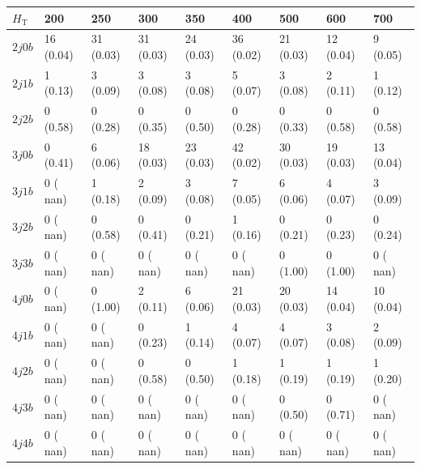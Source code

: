 \begin{table}[h]
\small
\begin{tabular}{lllllllll}
\hline \hline
$H_\textrm{T}$                 &     200 &            250 &             300&             350&             400&             500&             600&             700  \\\hline\hline
$2j 0b$&          16 (0.04)&	   31 (0.03)&	   31 (0.03)&	   24 (0.03)&	   36 (0.02)&	   21 (0.03)&	   12 (0.04)&	    9 (0.05) \\\hline
$2j 1b$&           1 (0.13)&	    3 (0.09)&	    3 (0.08)&	    3 (0.08)&	    5 (0.07)&	    3 (0.08)&	    2 (0.11)&	    1 (0.12) \\\hline
$2j 2b$&           0 (0.58)&	    0 (0.28)&	    0 (0.35)&	    0 (0.50)&	    0 (0.28)&	    0 (0.33)&	    0 (0.58)&	    0 (0.58) \\\hline
$3j 0b$&           0 (0.41)&	    6 (0.06)&	   18 (0.03)&	   23 (0.03)&	   42 (0.02)&	   30 (0.03)&	   19 (0.03)&	   13 (0.04) \\\hline
$3j 1b$&           0 ( nan)&	    1 (0.18)&	    2 (0.09)&	    3 (0.08)&	    7 (0.05)&	    6 (0.06)&	    4 (0.07)&	    3 (0.09) \\\hline
$3j 2b$&           0 ( nan)&	    0 (0.58)&	    0 (0.41)&	    0 (0.21)&	    1 (0.16)&	    0 (0.21)&	    0 (0.23)&	    0 (0.24) \\\hline
$3j 3b$&           0 ( nan)&	    0 ( nan)&	    0 ( nan)&	    0 ( nan)&	    0 ( nan)&	    0 (1.00)&	    0 (1.00)&	    0 ( nan) \\\hline
$4j 0b$&           0 ( nan)&	    0 (1.00)&	    2 (0.11)&	    6 (0.06)&	   21 (0.03)&	   20 (0.03)&	   14 (0.04)&	   10 (0.04) \\\hline
$4j 1b$&           0 ( nan)&	    0 ( nan)&	    0 (0.23)&	    1 (0.14)&	    4 (0.07)&	    4 (0.07)&	    3 (0.08)&	    2 (0.09) \\\hline
$4j 2b$&           0 ( nan)&	    0 ( nan)&	    0 (0.58)&	    0 (0.50)&	    1 (0.18)&	    1 (0.19)&	    1 (0.19)&	    1 (0.20) \\\hline
$4j 3b$&           0 ( nan)&	    0 ( nan)&	    0 ( nan)&	    0 ( nan)&	    0 ( nan)&	    0 (0.50)&	    0 (0.71)&	    0 ( nan) \\\hline
$4j 4b$&           0 ( nan)&	    0 ( nan)&	    0 ( nan)&	    0 ( nan)&	    0 ( nan)&	    0 ( nan)&	    0 ( nan)&	    0 ( nan) \\\hline
\hline
\end{tabular}
\label{tab:sig_yields_VDM_nom}
\end{table}

